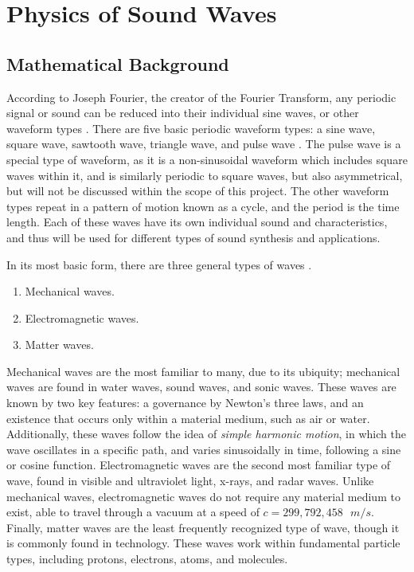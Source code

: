 \chapter{Physics of Sound Waves}\label{chapter:theory}

\section{Mathematical Background}\label{section:waveforms}
According to Joseph Fourier, the creator of the Fourier Transform, any periodic signal or sound can be reduced into their individual sine waves, or other waveform types \cite{Broughton_Bryan_2008}. There are five basic periodic waveform types: a sine wave, square wave, sawtooth wave, triangle wave, and pulse wave \cite{Winer_2018}. The pulse wave is a special type of waveform, as it is a non-sinusoidal waveform which includes square waves within it, and is similarly periodic to square waves, but also asymmetrical, but will not be discussed within the scope of this project. The other waveform types repeat in a pattern of motion known as a cycle, and the period is the time length. Each of these waves have its own individual sound and characteristics, and thus will be used for different types of sound synthesis and applications.

In its most basic form, there are three general types of waves \cite{Halliday_Resnick_Walker_2005}.

\begin{enumerate}
	\item Mechanical waves.
	\item Electromagnetic waves.
	\item Matter waves.
\end{enumerate}

Mechanical waves are the most familiar to many, due to its ubiquity; mechanical waves are found in water waves, sound waves, and sonic waves. These waves are known by two key features: a governance by Newton's three laws, and an existence that occurs only within a material medium, such as air or water. Additionally, these waves follow the idea of \textit{simple harmonic motion}, in which the wave oscillates in a specific path, and varies sinusoidally in time, following a sine or cosine function. Electromagnetic waves are the second most familiar type of wave, found in visible and ultraviolet light, x-rays, and radar waves. Unlike mechanical waves, electromagnetic waves do not require any material medium to exist, able to travel through a vacuum at a speed of $c = 299,792,458 \textrm{ } m/s$. Finally, matter waves are the least frequently recognized type of wave, though it is commonly found in technology. These waves work within fundamental particle types, including protons, electrons, atoms, and molecules. 

